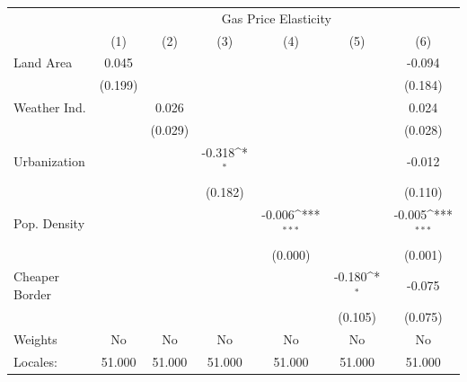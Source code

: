 {
\def\sym#1{\ifmmode^{#1}\else\(^{#1}\)\fi}
\begin{tabular}{l*{6}{c}}
\hline\hline
            &\multicolumn{6}{c}{Gas Price Elasticity}                                                                                           \\
            &\multicolumn{1}{c}{(1)}         &\multicolumn{1}{c}{(2)}         &\multicolumn{1}{c}{(3)}         &\multicolumn{1}{c}{(4)}         &\multicolumn{1}{c}{(5)}         &\multicolumn{1}{c}{(6)}         \\
\hline
Land Area   &       0.045         &                     &                     &                     &                     &      -0.094         \\
            &     (0.199)         &                     &                     &                     &                     &     (0.184)         \\
[1em]
Weather Ind.&                     &       0.026         &                     &                     &                     &       0.024         \\
            &                     &     (0.029)         &                     &                     &                     &     (0.028)         \\
[1em]
Urbanization&                     &                     &      -0.318\sym{*}  &                     &                     &      -0.012         \\
            &                     &                     &     (0.182)         &                     &                     &     (0.110)         \\
[1em]
Pop. Density&                     &                     &                     &      -0.006\sym{***}&                     &      -0.005\sym{***}\\
            &                     &                     &                     &     (0.000)         &                     &     (0.001)         \\
[1em]
Cheaper Border&                     &                     &                     &                     &      -0.180\sym{*}  &      -0.075         \\
            &                     &                     &                     &                     &     (0.105)         &     (0.075)         \\
\hline
Weights     &          No         &          No         &          No         &          No         &          No         &          No         \\
Locales:    &      51.000         &      51.000         &      51.000         &      51.000         &      51.000         &      51.000         \\
\hline\hline
\end{tabular}
}

